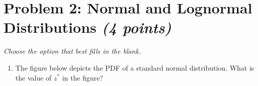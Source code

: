 \documentclass[11pt,twoside]{article}
\newcommand{\pts}[1]{\marginpar{ \small\hspace{0pt} \textit{[#1]} } }
\numberwithin{equation}{section}
\newcommand{\?}{\stackrel{?}{=}}
\begin{document}
 \section*{Problem 2: Normal and Lognormal Distributions \textit{(4 points)}}
{\it Choose the option that best fills in the blank.}
   \begin{enumerate}[\bf(a)]



   \item The figure below depicts the PDF of a standard normal distribution. What is the value of $z^{*}$ in the figure? \pts{1}


\end{enumerate}
\end{document}
